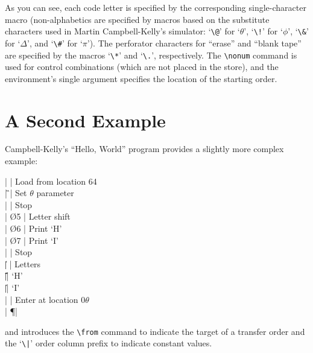 \documentclass[letterpaper,11pt]{article}
\begin{document}
As you can see, each code letter is specified by the corresponding
single-character
macro (non-alphabetics are specified by macros based on the substitute
characters used
in Martin Campbell-Kelly's simulator: `\verb"\@"' for `$\theta$',
`\verb"\!"' for `$\phi$', `\verb"\&"' for `$\Delta$',
and `\verb"\#"' for `$\pi$').  The perforator characters for ``erase''
and ``blank tape'' are specified by the macros `\verb"\*"' and
`\verb"\."', respectively.  The \verb"\nonum" command is used for
control combinations (which are not placed in the store), and the
environment's single argument specifies the
location of the starting order.

\section{A Second Example}
Campbell-Kelly's ``Hello, World'' program provides a slightly more
complex example:
\begin{edsac}{0}
\nonum       |    \K | Load from location 64   \\
\nonum       |   \G    \K | Set $\theta$ parameter  \\
 |   \Z    \F | Stop                    \\
             |   \O  5 \@ | Letter shift            \\
             |   \O  6 \@ | Print `H'               \\
             |   \O  7 \@ | Print `I'               \\
             |   \Z    \F | Stop                    \\
             |\| \*    \F | Letters                 \\
             |\| \H    \F | `H'                     \\
             |\| \I    \F | `I'                     \\
\nonum       |   \E    \Z | 
                              {Enter at location $0\theta$} \\
\nonum       |   \P    \F | 
\end{edsac}
and introduces the \verb"\from" command to indicate the target of a
transfer order and the `\verb"\|"' order column prefix to indicate
constant values.
\end{document}
